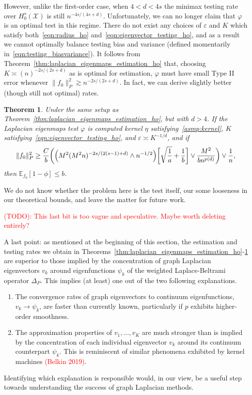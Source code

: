 \documentclass{article}
\newcommand{\1}{\mathbf{1}}
\newcommand{\mc}[1]{\mathcal{#1}}
\newcommand{\Ebb}{\mathbb{E}}
\theoremstyle{alden}
\theoremstyle{aldenthm}
\newtheorem{theorem}{Theorem}
\theoremstyle{definition}
\theoremstyle{remark}
\begin{document}
However, unlike the first-order case, when $4 < d < 4s$ the minimax testing rate over $H_0^s(\mc{X})$ is still $n^{-4s/(4s + d)}$. Unfortunately, we can no longer claim that $\varphi$ is an optimal test in this regime. There do not exist any choices of $\varepsilon$ and $K$ which satisfy both~\eqref{eqn:radius_ho} and~\eqref{eqn:eigenvector_testing_ho}, and as a result we cannot optimally balance testing bias and variance (defined momentarily in~\eqref{eqn:testing_biasvariance}). It follows from Theorem~\ref{thm:laplacian_eigenmaps_estimation_ho} that, choosing $K \asymp (n)^{-2s/(2s + d)}$ as is optimal for estimation, $\varphi$ must have small Type II error whenever $\|f_0\|_P^2 \gtrsim n^{-2s/(2s + d)}$. In fact, we can derive slightly better (though still not optimal) rates.
\begin{theorem}
	\label{thm:laplacian_eigenmaps_testing_ho_suboptimal}
	Under the same setup as Theorem~\ref{thm:laplacian_eigenmaps_estimation_ho}, but with $d > 4$. If the Laplacian eigenmaps test $\varphi$ is computed kernel $\eta$ satisfying~\eqref{asmp:kernel}, $K$ satisfying~\eqref{eqn:eigenvector_testing_ho}, and $\varepsilon \asymp K^{-1/d}$, and if 
	\begin{equation}
	\label{eqn:laplacian_eigenmaps_testing_criticalradius_ho_suboptimal}
	\|f_0\|_P^2 \geq \frac{C}{b}\biggl(\Bigl(M^2(M^2n)^{-2s/(2(s - 1) + d) } \wedge n^{-1/2}\Bigr)\biggl[\sqrt{\frac{1}{a}} + \frac{1}{b}\biggr] \vee \frac{M^2}{b n^{p(d)}} \biggr) \vee \frac{1}{n},
	\end{equation}
	then $\Ebb_{f_0}[1 - \phi] \leq b$.
\end{theorem}
We do not know whether the problem here is the test itself, our some looseness in our theoretical bounds, and leave the matter for future work.

\textcolor{red}{(TODO): This last bit is too vague and speculative. Maybe worth deleting entirely?}

A last point: as mentioned at the beginning of this section, the estimation and testing rates we obtain in Theorems~\ref{thm:laplacian_eigenmaps_estimation_ho}-\ref{thm:laplacian_eigenmaps_testing_ho_suboptimal} are superior to those implied by the concentration of graph Laplacian eigenvectors $v_k$ around eigenfunctions $\psi_k$ of the weighted Laplace-Beltrami operator $\Delta_P$. This implies (at least) one out of the two following explanations.
\begin{enumerate}
	\item The convergence rates of graph eigenvectors to continuum eigenfunctions, $v_k \to \psi_k$, are faster than currently known,  particularly if $p$ exhibits higher-order smoothness.
	\item The approximation properties of $v_1,\ldots,v_K$ are much stronger than is implied by the concentration of each individual eigenvector $v_k$ around its continuum counterpart $\psi_k$. This is reminiscent of similar phenomena exhibited by kernel machines \textcolor{red}{(Belkin 2019)}.
\end{enumerate}
Identifying which explanation is responsible would, in our view, be a useful step towards understanding the success of graph Laplacian methods.
\end{document}
